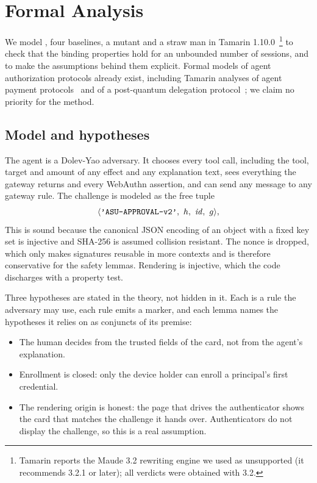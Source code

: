 \section{Formal Analysis}\label{sec:formal}

We model \sys{}, four baselines, a mutant and a straw man in Tamarin 1.10.0~\citep{meier2013tamarin}\footnote{Tamarin
reports the Maude 3.2 rewriting engine we used as unsupported (it recommends 3.2.1 or later); all verdicts were
obtained with 3.2.} to check that the binding properties
hold for an unbounded number of sessions, and to make the assumptions behind them explicit.
Formal models of agent authorization protocols already exist, including Tamarin analyses of agent payment
protocols~\citep{jiang2026payment} and of a post-quantum delegation protocol~\citep{chen2026aith}; we claim no
priority for the method.

\subsection{Model and hypotheses}

The agent is a Dolev-Yao adversary. It chooses every tool call, including the tool, target and amount of
any effect and any explanation text, sees everything the gateway
returns and every WebAuthn assertion, and can send any message to any gateway rule. The challenge is modeled as
the free tuple
\[\langle\texttt{'ASU-APPROVAL-v2'},\ \dig,\ \mathit{id},\ g\rangle,\]
This is sound because the canonical
JSON encoding of an object with a fixed key set is injective and SHA-256 is assumed collision resistant. The
nonce is dropped, which only makes signatures reusable in more contexts and is therefore conservative for the
safety lemmas. Rendering is injective, which the code discharges with a property test.

Three hypotheses are stated in the theory, not hidden in it. Each is a rule the adversary may use, each rule
emits a marker, and each lemma names the hypotheses it relies on as conjuncts of its premise:
\begin{itemize}[leftmargin=1.4em,itemsep=1pt]
\item[\Hyp{1}] The human decides from the trusted fields of the card, not from the agent's explanation.
\item[\Hyp{2}] Enrollment is closed: only the device holder can enroll a principal's first credential.
\item[\Hyp{3}] The rendering origin is honest: the page that drives the authenticator shows the card that
  matches the challenge it hands over. Authenticators do not display the challenge, so this is a real assumption.
\end{itemize}


